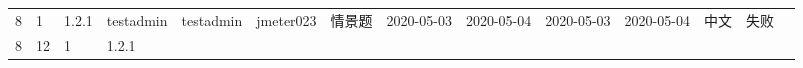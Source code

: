 \documentclass[hyperref, a4paper]{ctexart}
\begin{document}
\begin{longtable}[]{@{}llllllllllllll@{}}
\begin{minipage}[t]{0.12\columnwidth}
8\strut
\end{minipage} & \begin{minipage}[t]{0.03\columnwidth}\raggedright
1\strut
\end{minipage} & \begin{minipage}[t]{0.06\columnwidth}\raggedright
1.2.1\strut
\end{minipage} & \begin{minipage}[t]{0.04\columnwidth}\raggedright
testadmin\strut
\end{minipage} & \begin{minipage}[t]{0.04\columnwidth}\raggedright
testadmin\strut
\end{minipage} & \begin{minipage}[t]{0.04\columnwidth}\raggedright
jmeter023\strut
\end{minipage} & \begin{minipage}[t]{0.02\columnwidth}\raggedright
情景题\strut
\end{minipage} & \begin{minipage}[t]{0.04\columnwidth}\raggedright
2020-05-03\strut
\end{minipage} & \begin{minipage}[t]{0.05\columnwidth}\raggedright
2020-05-04\strut
\end{minipage} & \begin{minipage}[t]{0.07\columnwidth}\raggedright
2020-05-03\strut
\end{minipage} & \begin{minipage}[t]{0.08\columnwidth}\raggedright
2020-05-04\strut
\end{minipage} & \begin{minipage}[t]{0.04\columnwidth}\raggedright
中文\strut
\end{minipage} & \begin{minipage}[t]{0.02\columnwidth}\raggedright
失败\strut
\end{minipage}\tabularnewline
\begin{minipage}[t]{0.01\columnwidth}\raggedright
8\strut
\end{minipage} & \begin{minipage}[t]{0.12\columnwidth}\raggedright
12\strut
\end{minipage} & \begin{minipage}[t]{0.03\columnwidth}\raggedright
1\strut
\end{minipage} & \begin{minipage}[t]{0.06\columnwidth}\raggedright
1.2.1\strut
\end{minipage} & \begin{minipage}[t]{0.04\columnwidth}\raggedright

\end{minipage}
\end{longtable}
\end{document}
